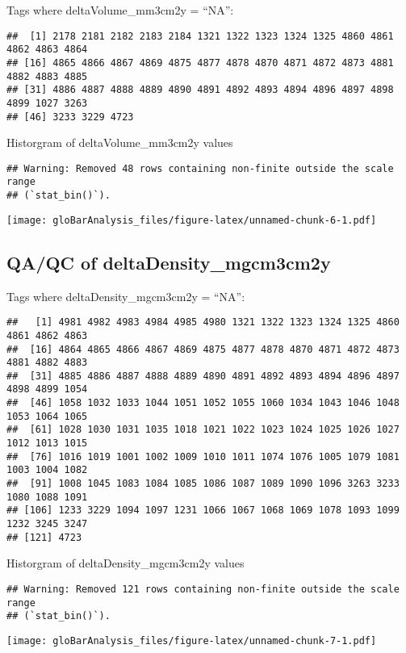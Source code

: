 \documentclass[
]{article}
\begin{document}
Tags where deltaVolume\_mm3cm2y = ``NA'':

\begin{verbatim}
##  [1] 2178 2181 2182 2183 2184 1321 1322 1323 1324 1325 4860 4861 4862 4863 4864
## [16] 4865 4866 4867 4869 4875 4877 4878 4870 4871 4872 4873 4881 4882 4883 4885
## [31] 4886 4887 4888 4889 4890 4891 4892 4893 4894 4896 4897 4898 4899 1027 3263
## [46] 3233 3229 4723
\end{verbatim}

Historgram of deltaVolume\_mm3cm2y values

\begin{verbatim}
## Warning: Removed 48 rows containing non-finite outside the scale range
## (`stat_bin()`).
\end{verbatim}

\texttt{[image: gloBarAnalysis\_files/figure-latex/unnamed-chunk-6-1.pdf]}

\hypertarget{qaqc-of-deltadensity_mgcm3cm2y}{%
\subsection{QA/QC of
deltaDensity\_mgcm3cm2y}\label{qaqc-of-deltadensity_mgcm3cm2y}}

Tags where deltaDensity\_mgcm3cm2y = ``NA'':

\begin{verbatim}
##   [1] 4981 4982 4983 4984 4985 4980 1321 1322 1323 1324 1325 4860 4861 4862 4863
##  [16] 4864 4865 4866 4867 4869 4875 4877 4878 4870 4871 4872 4873 4881 4882 4883
##  [31] 4885 4886 4887 4888 4889 4890 4891 4892 4893 4894 4896 4897 4898 4899 1054
##  [46] 1058 1032 1033 1044 1051 1052 1055 1060 1034 1043 1046 1048 1053 1064 1065
##  [61] 1028 1030 1031 1035 1018 1021 1022 1023 1024 1025 1026 1027 1012 1013 1015
##  [76] 1016 1019 1001 1002 1009 1010 1011 1074 1076 1005 1079 1081 1003 1004 1082
##  [91] 1008 1045 1083 1084 1085 1086 1087 1089 1090 1096 3263 3233 1080 1088 1091
## [106] 1233 3229 1094 1097 1231 1066 1067 1068 1069 1078 1093 1099 1232 3245 3247
## [121] 4723
\end{verbatim}

Historgram of deltaDensity\_mgcm3cm2y values

\begin{verbatim}
## Warning: Removed 121 rows containing non-finite outside the scale range
## (`stat_bin()`).
\end{verbatim}

\texttt{[image: gloBarAnalysis\_files/figure-latex/unnamed-chunk-7-1.pdf]}
\end{document}
